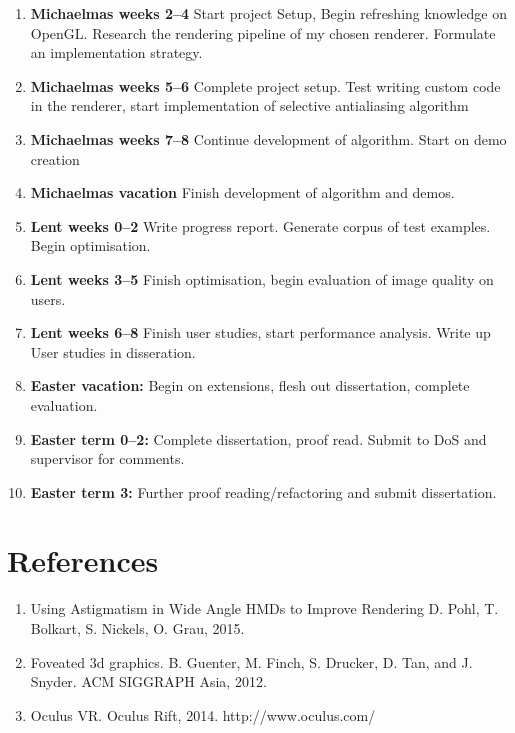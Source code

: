 \documentclass[12pt,a4paper,twoside]{article}
\begin{document}
\begin{enumerate}

\item \textbf{Michaelmas weeks 2--4} Start project Setup, Begin refreshing knowledge on OpenGL. Research the rendering pipeline of my chosen renderer. Formulate an implementation strategy.

\item \textbf{Michaelmas weeks 5--6} Complete project setup. Test writing custom code in the renderer, start implementation of selective antialiasing algorithm

\item \textbf{Michaelmas weeks 7--8} Continue development of algorithm. Start on demo creation

\item \textbf{Michaelmas vacation} Finish development of algorithm and demos.

\item \textbf{Lent weeks 0--2} Write progress report. Generate corpus of
  test examples. Begin optimisation.

\item \textbf{Lent weeks 3--5} Finish optimisation, begin evaluation of image quality on users.  

\item \textbf{Lent weeks 6--8} Finish user studies, start performance analysis. Write up User studies in disseration.

\item \textbf{Easter vacation:} Begin on extensions, flesh out dissertation, complete evaluation. 

\item \textbf{Easter term 0--2:}  Complete dissertation, proof read. Submit to DoS and supervisor for comments. 

\item \textbf{Easter term 3:} Further proof reading/refactoring and submit dissertation.

\end{enumerate}

\section*{References}

\begin{enumerate}

\item Using Astigmatism in Wide Angle HMDs to Improve Rendering D. Pohl, T. Bolkart, S. Nickels, O. Grau, 2015.
\item Foveated 3d graphics. B. Guenter, M. Finch, S. Drucker, D. Tan, and J. Snyder. ACM SIGGRAPH Asia, 2012.
\item Oculus VR. Oculus Rift, 2014. http://www.oculus.com/

\end{enumerate}
\end{document}

